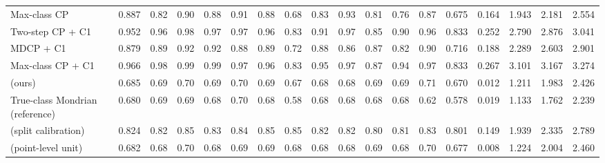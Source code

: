 \begin{table}[!htbp]
{\begin{tabular}{lccccccccccccccccc}
Max-class CP & 0.887 & 0.82 & 0.90 & 0.88 & 0.91 & 0.88 & 0.68 & 0.83 & 0.93 & 0.81 & 0.76 & 0.87 & 0.675 & 0.164 & 1.943 & 2.181 & 2.554 \\
Two-step CP + C1 & 0.952 & 0.96 & 0.98 & 0.97 & 0.97 & 0.96 & 0.83 & 0.91 & 0.97 & 0.85 & 0.90 & 0.96 & 0.833 & 0.252 & 2.790 & 2.876 & 3.041 \\
MDCP + C1 & 0.879 & 0.89 & 0.92 & 0.92 & 0.88 & 0.89 & 0.72 & 0.88 & 0.86 & 0.87 & 0.82 & 0.90 & 0.716 & 0.188 & 2.289 & 2.603 & 2.901 \\
Max-class CP + C1 & 0.966 & 0.98 & 0.99 & 0.99 & 0.97 & 0.96 & 0.83 & 0.95 & 0.97 & 0.87 & 0.94 & 0.97 & 0.833 & 0.267 & 3.101 & 3.167 & 3.274 \\
\gamut{} (ours) & 0.685 & 0.69 & 0.70 & 0.69 & 0.70 & 0.69 & 0.67 & 0.68 & 0.68 & 0.69 & 0.69 & 0.71 & 0.670 & 0.012 & 1.211 & 1.983 & 2.426 \\
True-class Mondrian (reference) & 0.680 & 0.69 & 0.69 & 0.68 & 0.70 & 0.68 & 0.58 & 0.68 & 0.68 & 0.68 & 0.68 & 0.62 & 0.578 & 0.019 & 1.133 & 1.762 & 2.239 \\
\gamut{} (split calibration) & 0.824 & 0.82 & 0.85 & 0.83 & 0.84 & 0.85 & 0.85 & 0.82 & 0.82 & 0.80 & 0.81 & 0.83 & 0.801 & 0.149 & 1.939 & 2.335 & 2.789 \\
\gamut{} (point-level unit) & 0.682 & 0.68 & 0.70 & 0.68 & 0.69 & 0.69 & 0.68 & 0.68 & 0.68 & 0.69 & 0.68 & 0.70 & 0.677 & 0.008 & 1.224 & 2.004 & 2.460 \\
\bottomrule
\end{tabular}}
\end{table}

